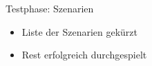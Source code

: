 \begin{frame}{Testphase: Szenarien}
    \begin{itemize}
        \item Liste der Szenarien gekürzt
        \pause
        \item Rest erfolgreich durchgespielt
    \end{itemize}
\end{frame} 